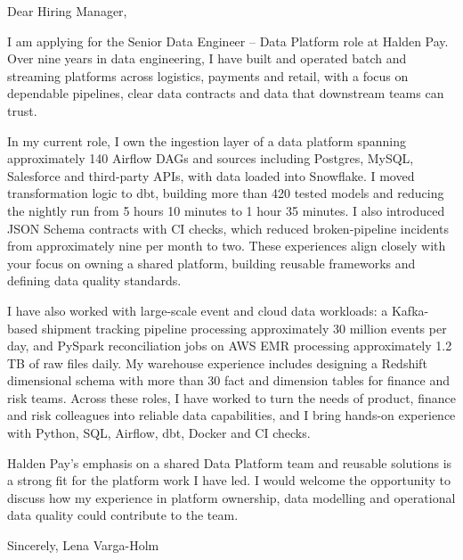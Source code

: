 \documentclass[11pt,a4paper]{article}
\begin{document}
Dear Hiring Manager,

I am applying for the Senior Data Engineer -- Data Platform role at Halden Pay. Over nine years in data engineering, I have built and operated batch and streaming platforms across logistics, payments and retail, with a focus on dependable pipelines, clear data contracts and data that downstream teams can trust.

In my current role, I own the ingestion layer of a data platform spanning approximately 140 Airflow DAGs and sources including Postgres, MySQL, Salesforce and third-party APIs, with data loaded into Snowflake. I moved transformation logic to dbt, building more than 420 tested models and reducing the nightly run from 5 hours 10 minutes to 1 hour 35 minutes. I also introduced JSON Schema contracts with CI checks, which reduced broken-pipeline incidents from approximately nine per month to two. These experiences align closely with your focus on owning a shared platform, building reusable frameworks and defining data quality standards.

I have also worked with large-scale event and cloud data workloads: a Kafka-based shipment tracking pipeline processing approximately 30 million events per day, and PySpark reconciliation jobs on AWS EMR processing approximately 1.2 TB of raw files daily. My warehouse experience includes designing a Redshift dimensional schema with more than 30 fact and dimension tables for finance and risk teams. Across these roles, I have worked to turn the needs of product, finance and risk colleagues into reliable data capabilities, and I bring hands-on experience with Python, SQL, Airflow, dbt, Docker and CI checks.

Halden Pay’s emphasis on a shared Data Platform team and reusable solutions is a strong fit for the platform work I have led. I would welcome the opportunity to discuss how my experience in platform ownership, data modelling and operational data quality could contribute to the team.

Sincerely,
Lena Varga-Holm
\end{document}
